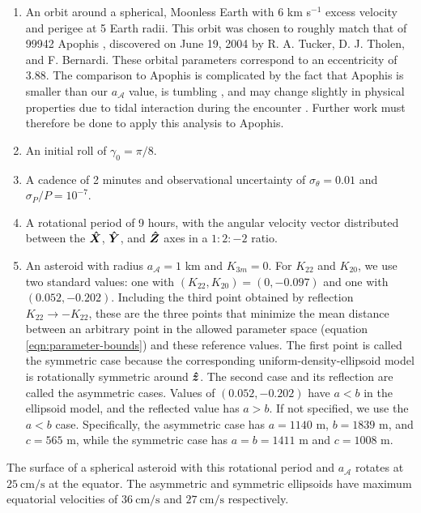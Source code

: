 \begin{enumerate}
  \item An orbit around a spherical, Moonless Earth with $6$ km s$^{-1}$ excess velocity and perigee at 5 Earth radii. This orbit was chosen to roughly match that of 99942 Apophis \cite{giorgini2005recent, giorgini2008predicting, smalley20052004}, discovered on June 19, 2004 by R. A. Tucker, D. J. Tholen, and F. Bernardi. These orbital parameters correspond to an eccentricity of 3.88. The comparison to Apophis is complicated by the fact that Apophis is smaller than our $a_\mathcal{A}$ value, is tumbling \cite{PRAVEC201448}, and may change slightly in physical properties due to tidal interaction during the encounter \cite{yu2014numerical,hirabayashi2021finite}. Further work must therefore be done to apply this analysis to Apophis. 
  \item An initial roll of $\gamma_0=\pi/8$.
  \item A cadence of 2 minutes and observational uncertainty of $\sigma_\theta = 0.01$ and $\sigma_P / P = 10^{-7}$.
  \item A rotational period of 9 hours, with the angular velocity vector distributed between the $\bm{\hat{X}}$, $\bm{\hat{Y}}$, and $\bm{\hat{Z}}$ axes in a $1:2:-2$ ratio.
  \item An asteroid with radius $a_\mathcal{A} = 1$ km and $K_{3m}=0$. For $K_{22}$ and $K_{20}$, we use two standard values: one with $(K_{22}, K_{20}) = (0, -0.097)$ and one with $(0.052, -0.202)$. Including the third point obtained by reflection $K_{22}\rightarrow -K_{22}$, these are the three points that minimize the mean distance between an arbitrary point in the allowed parameter space (equation \ref{eqn:parameter-bounds}) and these reference values. The first point is called the symmetric case because the corresponding uniform-density-ellipsoid model is rotationally symmetric around $\bm{\hat{z}}$. The second case and its reflection are called the asymmetric cases. Values of $(0.052, -0.202)$ have $a < b$ in the ellipsoid model, and the reflected value has $a > b$. If not specified, we use the $a < b$ case. Specifically, the asymmetric case has $a=1140$ m, $b=1839$ m, and $c=565$ m, while the symmetric case has $a=b=1411$ m and $c=1008$ m.
\end{enumerate}

The surface of a spherical asteroid with this rotational period and $a_\mathcal{A}$ rotates at $\SI{25}{\centi\meter\per\second}$ at the equator. The asymmetric and symmetric ellipsoids have maximum equatorial velocities of $\SI{36}{\centi\meter\per\second}$ and $\SI{27}{\centi\meter\per\second}$ respectively.


